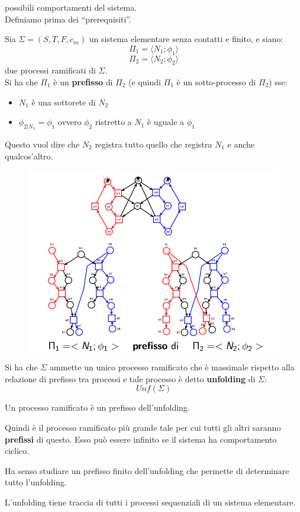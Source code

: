 possibili comportamenti del sistema.\\
Definiamo prima dei ``prerequisiti''.
\begin{definizione}[Prefisso]
  Sia $\Sigma=(S, T, F, c_{in})$ un sistema elementare senza contatti e finito, e
  siano:
  \[\Pi_1=\langle N_1;\phi_1\rangle\]
  \[\Pi_2=\langle N_2;\phi_2\rangle\]
  due processi ramificati di $\Sigma$.\\
  Si ha che $\Pi_1$ è un \textbf{prefisso} di $\Pi_2$ (e quindi $\Pi_1$ è un
  sotto-processo di $\Pi_2$) sse:
  \begin{itemize}
    \item $N_1$ è una sottorete di $N_2$
    \item $\phi_{2|N_1}=\phi_1$ ovvero $\phi_2$ ristretto a $N_1$  è uguale a
    $\phi_1$ 
  \end{itemize}
  Questo vuol dire che $N_2$ registra tutto quello che registra $N_1$ e anche qualcos'altro.
  \end{definizione}
  \begin{figure}[H]
    \centering
    \includegraphics[width=1\textwidth]{img/prefisso.png}
\end{figure}
  \begin{definizione}[Unfolding]
  Si ha che $\Sigma$ ammette un unico processo ramificato che è massimale
  rispetto alla relazione di prefisso tra processi e tale processo è detto
  \textbf{unfolding} di $\Sigma$:
  \[Unf(\Sigma)\]
  \begin{corollario}
   Un processo ramificato è un prefisso dell'unfolding.
  \end{corollario}
  \begin{nota}
    Quindi è il processo ramificato più grande tale per cui tutti gli altri saranno \textbf{prefissi} di questo.
  Esso può essere infinito se il sistema ha comportamento ciclico.
  \end{nota}
  \begin{nota}
  Ha senso studiare un prefisso finito dell'unfolding che permette di
  determinare tutto l'unfolding.
  \end{nota}
  \begin{nota}
    L'unfolding tiene traccia di tutti i processi sequenziali di un sistema
  elementare. 
  \end{nota}
\end{definizione} \vspace{5mm} %
